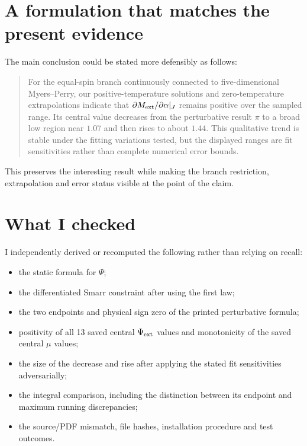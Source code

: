 \documentclass[11pt,a4paper]{article}
\begin{document}
\section*{A formulation that matches the present evidence}

The main conclusion could be stated more defensibly as follows:

\begin{quote}
For the equal-spin branch continuously connected to five-dimensional Myers--Perry, our positive-temperature solutions and zero-temperature extrapolations indicate that $\partial M_{\rm ext}/\partial\alpha|_J$ remains positive over the sampled range.  Its central value decreases from the perturbative result $\pi$ to a broad low region near $1.07$ and then rises to about $1.44$.  This qualitative trend is stable under the fitting variations tested, but the displayed ranges are fit sensitivities rather than complete numerical error bounds.
\end{quote}

This preserves the interesting result while making the branch restriction, extrapolation and error status visible at the point of the claim.

\section*{What I checked}

I independently derived or recomputed the following rather than relying on recall:

\begin{itemize}
\item the static formula for $\Psi$;
\item the differentiated Smarr constraint after using the first law;
\item the two endpoints and physical sign zero of the printed perturbative formula;
\item positivity of all 13 saved central $\Psi_{\rm ext}$ values and monotonicity of the saved central $\mu$ values;
\item the size of the decrease and rise after applying the stated fit sensitivities adversarially;
\item the integral comparison, including the distinction between its endpoint and maximum running discrepancies;
\item the source/PDF mismatch, file hashes, installation procedure and test outcomes.
\end{itemize}
\end{document}

